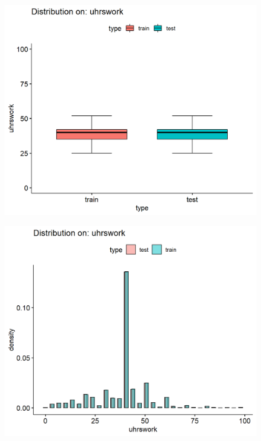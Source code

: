 \documentclass[11pt, letter,twocolumn]{article}
\begin{document}
\begin{figure}[ht]
	\centering

	\label{fig:unnamed-chunk-8-5}
	\includegraphics[width=0.9\linewidth]{imgs/preliminary_analysis/unnamed-chunk-8-5}
\end{figure}

\begin{figure}[ht]
	\centering
	\label{fig:unnamed-chunk-8-4}
	\includegraphics[width=0.9\linewidth]{imgs/preliminary_analysis/unnamed-chunk-8-4}
\end{figure}
\end{document}

